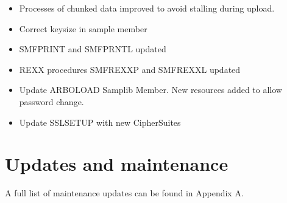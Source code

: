\documentclass[letterpaper,10pt,english]{sphinxmanual}
\begin{document}
\begin{itemize}
\item {} 
Processes of chunked data improved to avoid stalling during upload.

\end{itemize}

\begin{itemize}
\item {} 
Correct keysize in sample member

\end{itemize}

\begin{itemize}
\item {} 
SMFPRINT and SMFPRNTL updated

\item {} 
REXX procedures SMFREXXP and SMFREXXL updated

\end{itemize}

\begin{itemize}
\item {} 
Update ARBOLOAD Samplib Member. New resources added to allow password change.

\end{itemize}

\begin{itemize}
\item {} 
Update SSLSETUP with new CipherSuites

\end{itemize}


\chapter{Updates and maintenance}
\label{\detokenize{TN202303:updates-and-maintenance}}
A full list of maintenance updates can be found in Appendix A.

\newpage
\end{document}
